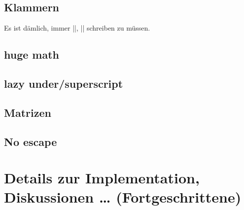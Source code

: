 \documentclass{scrartcl}
\begin{document}
\subsection{Klammern}
Es ist dämlich, immer |\left|, |\right| schreiben zu müssen.
\subsection{huge math}
\subsection{lazy under/superscript}
\subsection{Matrizen}
\subsection{No escape}

\section{Details zur Implementation, Diskussionen … (Fortgeschrittene)}
\end{document}
